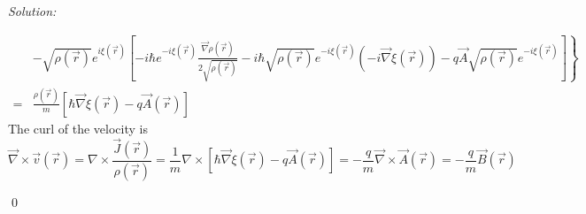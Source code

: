 \documentclass[12pt,a4paper]{article}
\newenvironment{sol}
    {\emph{Solution:}
    }
    {
    \qed
    }
\begin{document}
\begin{sol}
\begin{itemize}
\begin{align}
\nonumber&\left.-\sqrt{\rho(\vec{r})}e^{i\xi(\vec{r})}\left[-i\hbar e^{-i\xi(\vec{r})}\frac{\vec{\nabla}\rho(\vec{r})}{2\sqrt{\rho(\vec{r})}}-i\hbar\sqrt{\rho(\vec{r})}e^{-i\xi(\vec{r})}(-i\vec{\nabla}\xi(\vec{r}))-q\vec{A}\sqrt{\rho(\vec{r})}e^{-i\xi(\vec{r})}\right]\right\}\\
=&\frac{\rho(\vec{r})}{m}[\hbar\vec{\nabla}\xi(\vec{r})-q\vec{A}(\vec{r})]
\end{align}
The curl of the velocity is
\begin{equation}
\vec{\nabla}\times\vec{v}(\vec{r})=\nabla\times\frac{\vec{J}(\vec{r})}{\rho(\vec{r})}=\frac{1}{m}\nabla\times[\hbar\vec{\nabla}\xi(\vec{r})-q\vec{A}(\vec{r})]=-\frac{q}{m}\vec{\nabla}\times\vec{A}(\vec{r})=-\frac{q}{m}\vec{B}(\vec{r})
\end{equation}
\end{itemize}
\end{sol}
\end{document}
